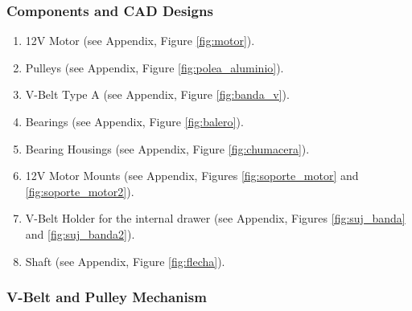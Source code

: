 \subsubsection{Components and CAD Designs}
    \begin{enumerate}
        \item 12V Motor (see Appendix, Figure \ref{fig:motor}).
            
        \item Pulleys (see Appendix, Figure \ref{fig:polea_aluminio}).
    
        \item V-Belt Type A (see Appendix, Figure \ref{fig:banda_v}).
        
        \item Bearings (see Appendix, Figure \ref{fig:balero}).

        \item Bearing Housings (see Appendix, Figure \ref{fig:chumacera}).
        
        \item 12V Motor Mounts (see Appendix, Figures \ref{fig:soporte_motor} and \ref{fig:soporte_motor2}).
        
        \item V-Belt Holder for the internal drawer (see Appendix, Figures \ref{fig:suj_banda} and \ref{fig:suj_banda2}).
        
        \item Shaft (see Appendix, Figure \ref{fig:flecha}).
            
    \end{enumerate}

\subsubsection{V-Belt and Pulley Mechanism}
\documentclass{article}
\usepackage{graphicx}
\usepackage{caption}
\usepackage{subcaption}
\usepackage{float}



The following images illustrate the key components of the internal drawer movement mechanism used in the project. Figure \ref{fig:mecanismo_views} shows three critical views: the motor mounts, bearing housings, and belt holder, all of which are 3D-printed and integral to the system's functionality.

